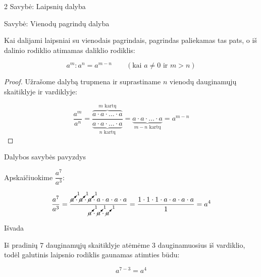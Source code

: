 \documentclass[aspectratio=169,10pt]{beamer}
\newenvironment{property}[1][]%
{\begin{block}{Savybė: #1}}%
{\end{block}}
\begin{document}
\begin{frame}{2 Savybė: Laipsnių dalyba}

    \begin{property}[Vienodų pagrindų dalyba]

        Kai dalijami laipsniai su vienodais pagrindais,
        pagrindas paliekamas tas pats, o iš dalinio rodiklio
        atimamas daliklio rodiklis:

        \[
        a^m:a^n=a^{m-n}
        \qquad
        (\text{kai }a\neq0\text{ ir }m>n)
        \]

    \end{property}

    \begin{proof}

        Užrašome dalybą trupmena ir suprastiname
        $n$ vienodų dauginamųjų skaitiklyje ir vardiklyje:

        \[
        \frac{a^m}{a^n}
        =
        \frac{
        \overbrace{
        a\cdot a\cdot\dots\cdot a
        }^{m\text{ kartų}}
        }{
        \underbrace{
        a\cdot a\cdot\dots\cdot a
        }_{n\text{ kartų}}
        }
        =
        \underbrace{
        a\cdot a\cdot\dots\cdot a
        }_{m-n\text{ kartų}}
        =
        a^{m-n}
        \]

    \end{proof}

\end{frame}


\begin{frame}{Dalybos savybės pavyzdys}

    \begin{example}

        Apskaičiuokime $\dfrac{a^7}{a^3}$:

        \[
        \frac{a^7}{a^3}
        =
        \frac{
        \cancelto{1}{a}\cdot
        \cancelto{1}{a}\cdot
        \cancelto{1}{a}\cdot
        a\cdot a\cdot a\cdot a
        }{
        \cancelto{1}{a}\cdot
        \cancelto{1}{a}\cdot
        \cancelto{1}{a}
        }
        =
        \frac{
        1\cdot1\cdot1\cdot
        a\cdot a\cdot a\cdot a
        }{1}
        =
        a^4
        \]

    \end{example}

    \begin{block}{Išvada}

        Iš pradinių $7$ dauginamųjų skaitiklyje
        atėmėme $3$ dauginamuosius iš vardiklio,
        todėl galutinis laipsnio rodiklis gaunamas atimties būdu:

        \[
        a^{7-3}=a^4
        \]

    \end{block}

\end{frame}
\end{document}
